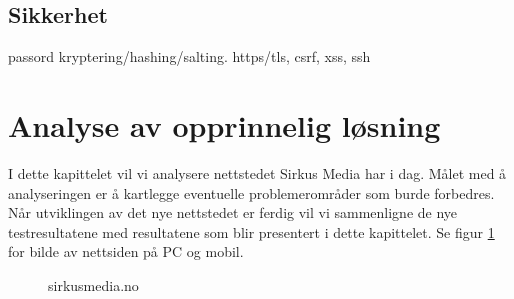 \subsection{Sikkerhet}
 passord kryptering/hashing/salting. https/tls, csrf, xss, ssh

\section{Analyse av opprinnelig løsning}

I dette kapittelet vil vi analysere nettstedet Sirkus Media har i dag. Målet med å analyseringen er å kartlegge eventuelle problemerområder som burde forbedres. Når utviklingen av det nye nettstedet er ferdig vil vi sammenligne de nye testresultatene med resultatene som blir presentert i dette kapittelet.
Se figur \ref{fig:analysis-current-sirkusmedia.no} for bilde av nettsiden på PC og mobil.

\begin{figure}[H]
    \begin{center}
        \label{fig:analysis-current-sirkusmedia.no}
        \caption{sirkusmedia.no}
    \end{center}
\end{figure}

